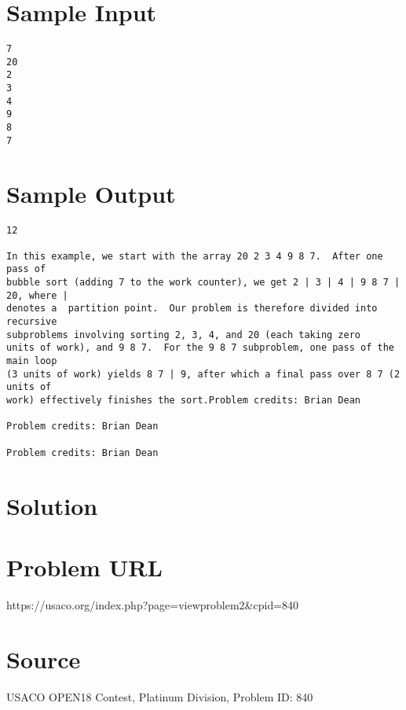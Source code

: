\documentclass[12pt]{article}
\begin{document}
\section*{Sample Input}
\begin{verbatim}
7
20
2
3
4
9
8
7
\end{verbatim}

\section*{Sample Output}
\begin{verbatim}
12

In this example, we start with the array 20 2 3 4 9 8 7.  After one pass of
bubble sort (adding 7 to the work counter), we get 2 | 3 | 4 | 9 8 7 | 20, where |
denotes a  partition point.  Our problem is therefore divided into recursive
subproblems involving sorting 2, 3, 4, and 20 (each taking zero
units of work), and 9 8 7.  For the 9 8 7 subproblem, one pass of the main loop
(3 units of work) yields 8 7 | 9, after which a final pass over 8 7 (2 units of
work) effectively finishes the sort.Problem credits: Brian Dean

Problem credits: Brian Dean

Problem credits: Brian Dean
\end{verbatim}

\section*{Solution}


\section*{Problem URL}
https://usaco.org/index.php?page=viewproblem2&cpid=840

\section*{Source}
USACO OPEN18 Contest, Platinum Division, Problem ID: 840
\end{document}
